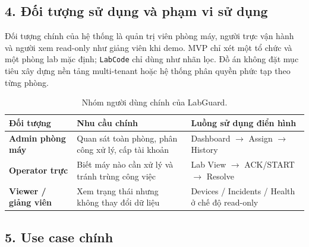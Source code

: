 \subsection*{4. Đối tượng sử dụng và phạm vi sử dụng}

Đối tượng chính của hệ thống là quản trị viên phòng máy, người trực vận hành và người xem read-only như giảng viên khi demo. MVP chỉ xét một tổ chức và một phòng lab mặc định; \texttt{LabCode} chỉ dùng như nhãn lọc. Đồ án không đặt mục tiêu xây dựng nền tảng multi-tenant hoặc hệ thống phân quyền phức tạp theo từng phòng.

\begin{table}[!ht]
\centering
\caption{Nhóm người dùng chính của LabGuard.}
\label{tab:personas}
\begin{tabularx}{\textwidth}{>{\bfseries}p{3.2cm} X X}
\toprule
Đối tượng & Nhu cầu chính & Luồng sử dụng điển hình \\
\midrule
Admin phòng máy & Quan sát toàn phòng, phân công xử lý, cấp tài khoản & Dashboard $\rightarrow$ Assign $\rightarrow$ History \\
Operator trực & Biết máy nào cần xử lý và tránh trùng công việc & Lab View $\rightarrow$ ACK/START $\rightarrow$ Resolve \\
Viewer / giảng viên & Xem trạng thái nhưng không thay đổi dữ liệu & Devices / Incidents / Health ở chế độ read-only \\
\bottomrule
\end{tabularx}
\end{table}

\subsection*{5. Use case chính}

